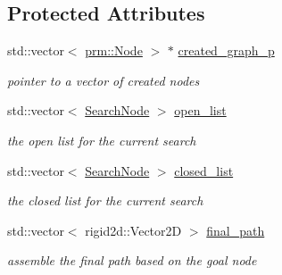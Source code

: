\subsection*{Protected Attributes}
\begin{DoxyCompactItemize}
\item 
\mbox{\label{classhsearch_1_1HSearch_a92b4944c741acab45fc3c71661f1aa42}} 
std\+::vector$<$ \hyperlink{structprm_1_1Node}{prm\+::\+Node} $>$ $\ast$ \hyperlink{classhsearch_1_1HSearch_a92b4944c741acab45fc3c71661f1aa42}{created\+\_\+graph\+\_\+p}
\begin{DoxyCompactList}\small\item\em pointer to a vector of created nodes \end{DoxyCompactList}\item 
\mbox{\label{classhsearch_1_1HSearch_a20e68d7726e57a42cb65427b7f9da89f}} 
std\+::vector$<$ \hyperlink{structhsearch_1_1SearchNode}{Search\+Node} $>$ \hyperlink{classhsearch_1_1HSearch_a20e68d7726e57a42cb65427b7f9da89f}{open\+\_\+list}
\begin{DoxyCompactList}\small\item\em the open list for the current search \end{DoxyCompactList}\item 
\mbox{\label{classhsearch_1_1HSearch_ae85581fef9d5887f154d2d3b9ea3a06e}} 
std\+::vector$<$ \hyperlink{structhsearch_1_1SearchNode}{Search\+Node} $>$ \hyperlink{classhsearch_1_1HSearch_ae85581fef9d5887f154d2d3b9ea3a06e}{closed\+\_\+list}
\begin{DoxyCompactList}\small\item\em the closed list for the current search \end{DoxyCompactList}\item 
\mbox{\label{classhsearch_1_1HSearch_a3188c5cda32b79ace51327a4ede85f33}} 
std\+::vector$<$ rigid2d\+::\+Vector2D $>$ \hyperlink{classhsearch_1_1HSearch_a3188c5cda32b79ace51327a4ede85f33}{final\+\_\+path}
\begin{DoxyCompactList}\small\item\em assemble the final path based on the goal node \end{DoxyCompactList}\item 
\mbox{\label{classhsearch_1_1HSearch_a1c457adbfabaf7ff5f07fef685369991}} 

\end{DoxyCompactItemize}
